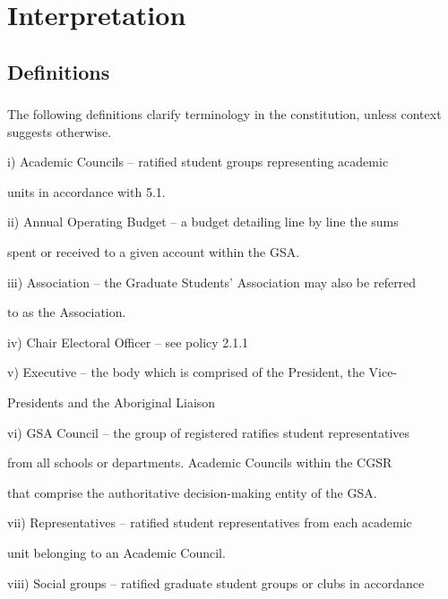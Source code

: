 \documentclass{article}
\begin{document}
\section{Interpretation}

\subsection{Definitions}  
\subsubsection{} The   following  definitions  clarify   terminology  in   the   constitution,  unless  context suggests  otherwise.  



i)      Academic  Councils  –  ratified  student  groups  representing  academic  

units in accordance with 5.1.  



ii)     Annual  Operating  Budget  –  a  budget  detailing line  by  line  the  sums  

 spent or received to a given account within the GSA.  



iii)    Association – the Graduate Students’ Association may also be referred  

to as the Association.  



iv)      Chair Electoral Officer – see policy 2.1.1  



v)      Executive  –  the body which is comprised of the President, the Vice- 

Presidents and the Aboriginal Liaison  



vi)      GSA Council – the group of registered ratifies student representatives  

 from all schools or departments. Academic Councils within the CGSR  

that comprise the authoritative decision-making entity of the GSA.  



vii)    Representatives –  ratified student representatives from each academic  

unit belonging to an Academic Council.  



viii)    Social groups – ratified graduate student groups or clubs in accordance  
\end{document}
